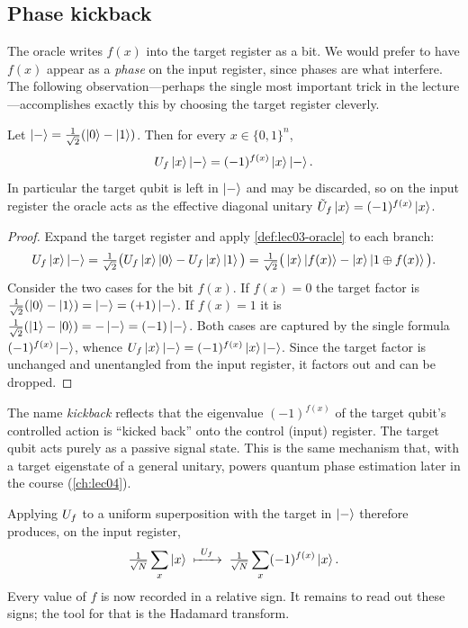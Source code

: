 \subsection{Phase kickback}

The oracle writes $f(x)$ into the target register as a bit. We would prefer to
have $f(x)$ appear as a \emph{phase} on the input register, since phases are what
interfere. The following observation---perhaps the single most important trick in
the lecture---accomplishes exactly this by choosing the target register cleverly.

\begin{lemma}
\label{lem:lec03-kickback}
Let $\ket{-}=\tfrac{1}{\sqrt2}(\ket{0}-\ket{1})$. Then for every $x\in\{0,1\}^n$,
\[
  U_{f}\ket{x}\ket{-}=(-1)^{f(x)}\ket{x}\ket{-}.
\]
In particular the target qubit is left in $\ket{-}$ and may be discarded, so on
the input register the oracle acts as the effective diagonal unitary
$\tilde U_f\ket{x}=(-1)^{f(x)}\ket{x}$.
\end{lemma}

\begin{proof}
Expand the target register and apply \cref{def:lec03-oracle} to each branch:
\[
  U_{f}\ket{x}\ket{-}
  =\tfrac{1}{\sqrt2}\big(U_{f}\ket{x}\ket{0}-U_{f}\ket{x}\ket{1}\big)
  =\tfrac{1}{\sqrt2}\big(\ket{x}\ket{f(x)}-\ket{x}\ket{1\oplus f(x)}\big).
\]
Consider the two cases for the bit $f(x)$. If $f(x)=0$ the target factor is
$\tfrac{1}{\sqrt2}(\ket{0}-\ket{1})=\ket{-}=(+1)\ket{-}$. If $f(x)=1$ it is
$\tfrac{1}{\sqrt2}(\ket{1}-\ket{0})=-\ket{-}=(-1)\ket{-}$. Both cases are captured
by the single formula $(-1)^{f(x)}\ket{-}$, whence
$U_{f}\ket{x}\ket{-}=(-1)^{f(x)}\ket{x}\ket{-}$. Since the target factor is unchanged
and unentangled from the input register, it factors out and can be dropped.
\end{proof}

\begin{remark}
\label{rem:lec03-kickback}
The name \emph{kickback} reflects that the eigenvalue $(-1)^{f(x)}$ of the target
qubit's controlled action is ``kicked back'' onto the control (input) register.
The target qubit acts purely as a passive signal state. This is the same mechanism
that, with a target eigenstate of a general unitary, powers quantum phase
estimation later in the course (\cref{ch:lec04}).
\end{remark}

Applying $U_{f}$ to a uniform superposition with the target in $\ket{-}$ therefore
produces, on the input register,
\[
  \tfrac{1}{\sqrt{N}}\sum_{x}\ket{x}\;\xmapsto{\ \Uf\ }\;
  \tfrac{1}{\sqrt{N}}\sum_{x}(-1)^{f(x)}\ket{x}.
\]
Every value of $f$ is now recorded in a relative sign. It remains to read out
these signs; the tool for that is the Hadamard transform.

